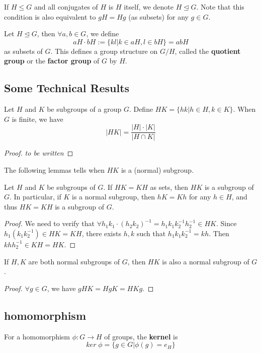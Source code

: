 \documentclass[11pt,fleqn]{book} %
\begin{document}
\begin{CJK}{UTF8}{gkai}
\begin{definition}
	 If $H \leq G$ and all conjugates of $H$ is $H$ itself, we denote $H \unlhd G$.
	Note that this condition is also equivalent to $gH = Hg$
	(as subsets) for any $g \in G$. 
\end{definition}

\begin{definition}
	 Let $H \unlhd G$, then $\forall a,b \in G$, we define
	\[aH \cdot bH:=\{kl | k\in aH, l \in bH\} = abH\]
	as subsets of $G$. This defines a group structure on $G/H$, called the {\bf quotient group} or the {\bf factor group} of $G$ by $H$.  
\end{definition}

\subsection{Some Technical Results}
\begin{proposition}
	Let $H$ and $K$ be subgroups of a group $G$. Define $HK = \{hk | h\in H, k\in K\}$. When $G$ is finite, we have 
	\[|HK| = \frac {|H| \cdot |K|} {|H \cap K|}\]
\end{proposition}

\begin{proof}
	{\it to be written}
\end{proof}

The following lemmas tells when $HK$ is a (normal) subgroup.
\begin{lemma}
	Let $H$ and $K$ be subgroups of $G$. If $HK = KH$ as sets, then $HK$ is a subgroup of $G$.
	In particular, if $K$ is a normal subgroup, then $hK = Kh$ for any $h \in H$, and thus $HK = KH$ is a subgroup of $G$.
\end{lemma}
\begin{proof}
	We need to verify that $\forall h_1k_1 \cdot (h_2k_2)^{-1} = h_1k_1k_2^{-1}h_2^{-1}\in HK$. Since $h_1(k_1k_2^{-1}) \in HK = KH$, there exists $h,k$ such that $h_1k_1k_2^{-1} = kh$. 
	Then $khh_2^{-1} \in KH = HK$.
\end{proof}

\begin{lemma}
	If $H, K$ are both normal subgroups of $G$, then $HK$ is also a normal subgroup of $G$.
\end{lemma}
\begin{proof}
	$\forall g \in G$, we have $gHK = HgK = HKg$. 	
\end{proof}

\subsection{homomorphism}
\begin{definition}
	 For a homomorphism $\phi: G \to H$ of groups, the {\bf kernel} is 
	\[ker \;\phi = \{g \in G | \phi(g) = e_H\}\]
\end{definition}


\end{CJK}
\end{document}
